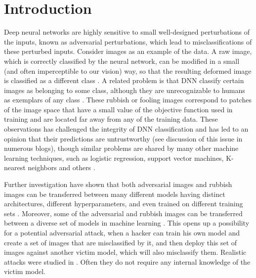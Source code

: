 \documentclass[12pt]{article} %
\begin{document}
\vspace{0.2cm}
\HRule

\section{Introduction}
Deep neural networks are highly sensitive to small well-designed perturbations of the inputs, known as adversarial perturbations, which lead to misclassifications of these perturbed inputs. Consider images as an example of the data. A raw image, which is correctly classified by the neural network, can be modified in a small (and often imperceptible to our vision) way, so that the resulting deformed image is classified as a different class \cite{Szegedy}. A related problem is that DNN classify certain images as belonging to some class, although they are unrecognizable to humans as exemplars of any class \cite{Nguyen}. These rubbish or fooling images correspond to patches of the image space that have a small value of the objective function used in training and are located far away from any of the training data. These observations has challenged the integrity of DNN classification and has led to an opinion that their predictions are untrustworthy (see discussion of this issue in numerous blogs), though similar problems are shared by many other machine learning techniques, such as logistic regression, support vector machines, K-nearest neighbors and others \cite{transferability}.  

Further investigation have shown that both adversarial images and rubbish images can be transferred between many different models having distinct architectures, different hyperparameters, and even trained on different training sets \cite{Szegedy,Nguyen}. Moreover, some of the adversarial and rubbish images can be transferred between a diverse set of models in machine learning \cite{transferability}. This opens up a possibility for a potential adversarial attack, when a hacker can train his own model and create a set of images that are misclassified by it, and then deploy this set of images against another victim model, which will also misclassify them. Realistic attacks were studied in \cite{transferability,practical_attack,Kurakin}. Often they do not require any internal knowledge of the victim model. 
\end{document}
